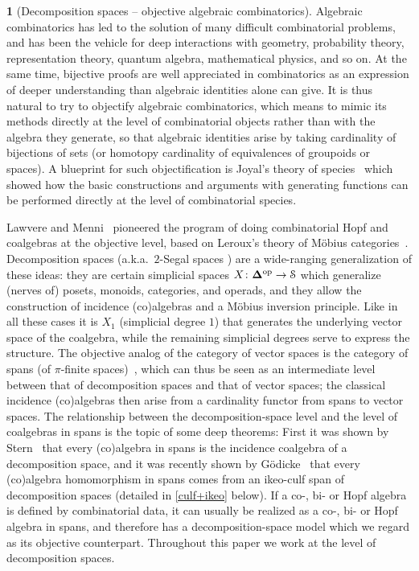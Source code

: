 \documentclass{amsart}
\newcommand{\simpl}{\mathbf{\Delta}}
\newcommand{\op}{\textup{op}}
\newcommand{\spaces}{\mathcal{S}}
\theoremstyle{definition}
\theoremstyle{noname}
\newtheorem{blanko}[theorem]{}
\begin{document}
\begin{blanko}[Decomposition spaces -- objective algebraic combinatorics]
  Algebraic combinatorics has led to the solution of many difficult
  combinatorial problems, and has been the vehicle for deep interactions with
  geometry, probability theory, representation theory,  quantum algebra, 
  mathematical physics, and so on. At the same time, bijective
  proofs are well appreciated in combinatorics as an expression of deeper understanding
  than algebraic identities alone can give. It is thus
  natural to try to objectify algebraic combinatorics, which means to mimic its
  methods directly at the level of combinatorial objects rather than with the algebra
  they generate, so that algebraic identities arise by taking
  cardinality of bijections of sets (or homotopy cardinality of equivalences of
  groupoids or spaces). A blueprint for such objectification is
  Joyal's theory of species~\cite{Joyal:1981} which showed how the basic 
  constructions and arguments with
  generating functions can be performed directly at the level of combinatorial
  species.
  
  Lawvere and Menni~\cite{Lawvere-Menni} pioneered the program of doing combinatorial
  Hopf and coalgebras at the objective level, based on Leroux's theory of M\"obius
  categories~\cite{Leroux:1976}.
  Decomposition spaces \cite{GKT1,GKT2,GKT3} (a.k.a.\ $2$-Segal
  spaces \cite{DyckerhoffKapranov:HSS}) are a wide-ranging generalization of these
  ideas: they are certain simplicial spaces $X\colon \simpl^\op\to\spaces$ which generalize (nerves of) 
  posets, monoids,
  categories, and operads, and they allow the construction of incidence (co)algebras
  and a M\"obius inversion principle. Like in all these cases it is $X_1$ (simplicial 
  degree $1$) that generates the underlying vector space of the coalgebra, while the 
  remaining simplicial degrees serve to express the structure.
  The objective analog of the category of vector spaces is the category of
  spans (of $\pi$-finite spaces)~\cite{Galvez-Kock-Tonks:1602.05082}, which can thus be seen as an 
  intermediate level between that of decomposition spaces and that of vector spaces; the classical incidence (co)algebras then arise 
  from
  a cardinality functor from spans to vector spaces.
  The relationship between the decomposition-space level and the level of coalgebras in spans is the topic of some deep theorems: First
  it was shown by Stern~\cite{Stern:1905.06671} that
  every (co)algebra in spans is the incidence coalgebra of a decomposition space, and 
  it was recently shown by G\"odicke~\cite{Godicke:IC2SS}
  that every (co)algebra homomorphism in spans 
  comes from an ikeo-culf span of decomposition spaces (detailed in \ref{culf+ikeo} below). If a 
  co-, bi- or Hopf algebra is defined by combinatorial data, it can usually
  be realized as a co-, bi- or Hopf algebra in spans, and therefore has a
  decomposition-space model which we regard as its objective counterpart.
  Throughout this paper we work at the level of decomposition spaces.
      

\end{blanko}
\end{document}
